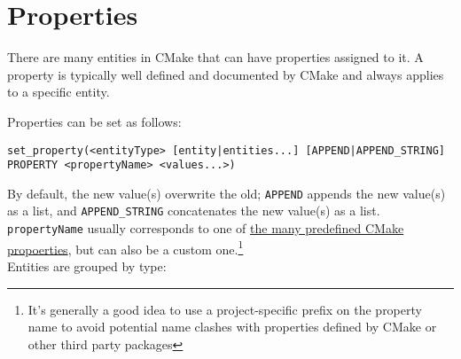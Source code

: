 \documentclass[8pt, table, xcdraw]{article}%
\begin{document}
\section{Properties}

There are many entities in CMake that can have properties assigned to it. A property is typically well defined and
documented by CMake and always applies to a specific entity.

Properties can be set as follows:

\begin{lstlisting}
set_property(<entityType> [entity|entities...] [APPEND|APPEND_STRING] PROPERTY <propertyName> <values...>)
\end{lstlisting}

By default, the new value(s) overwrite the old; \lstinline{APPEND} appends the new value(s) as a list, and \lstinline{APPEND_STRING} concatenates the new value(s) as a list. \lstinline{propertyName} usually corresponds to one of \href{https://cmake.org/cmake/help/latest/manual/cmake-properties.7.html}{the many predefined CMake propoerties}, but can also be a custom one.\footnote{It's generally a good idea to use a project-specific prefix on the property name to avoid potential name clashes with properties defined by CMake or other third party packages}\\
Entities are grouped by type:
\end{document}
